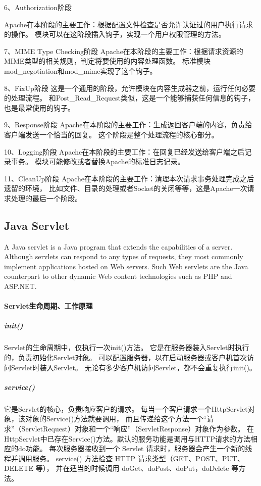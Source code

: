 \documentclass{book}
\begin{document}
6、Authorization阶段 

Apache在本阶段的主要工作：根据配置文件检查是否允许认证过的用户执行请求的操作。
模块可以在这阶段插入钩子，实现一个用户权限管理的方法。

7、MIME Type Checking阶段
Apache在本阶段的主要工作：根据请求资源的MIME类型的相关规则，判定将要使用的内容处理函数。
标准模块mod\_negotiation和mod\_mime实现了这个钩子。

8、FixUp阶段 
这是一个通用的阶段，允许模块在内容生成器之前，运行任何必要的处理流程。
和Post\_Read\_Request类似，这是一个能够捕获任何信息的钩子，也是最常使用的钩子。

9、Response阶段 
Apache在本阶段的主要工作：生成返回客户端的内容，负责给客户端发送一个恰当的回复。
这个阶段是整个处理流程的核心部分。

10、Logging阶段 
Apache在本阶段的主要工作：在回复已经发送给客户端之后记录事务。
模块可能修改或者替换Apache的标准日志记录。

11、CleanUp阶段 
Apache在本阶段的主要工作：清理本次请求事务处理完成之后遗留的环境，
比如文件、目录的处理或者Socket的关闭等等，这是Apache一次请求处理的最后一个阶段。

\subsection{Java Servlet}

A Java servlet is a Java program that extends the capabilities of a server. 
Although servlets can respond to any types of requests, 
they most commonly implement applications hosted on Web servers. 
Such Web servlets are the Java counterpart to other dynamic Web content technologies such as PHP and ASP.NET.

\paragraph{Servlet生命周期、工作原理}

\subparagraph{init()}Servlet的生命周期中，仅执行一次init()方法。
它是在服务器装入Servlet时执行的，负责初始化Servlet对象。
可以配置服务器，以在启动服务器或客户机首次访问Servlet时装入Servlet。
无论有多少客户机访问Servlet，都不会重复执行init()。

\subparagraph{service()}它是Servlet的核心，负责响应客户的请求。
每当一个客户请求一个HttpServlet对象，该对象的Service()方法就要调用，
而且传递给这个方法一个“请求”（ServletRequest）对象和一个“响应”（ServletResponse）对象作为参数。
在HttpServlet中已存在Service()方法。默认的服务功能是调用与HTTP请求的方法相应的do功能。
每次服务器接收到一个 Servlet 请求时，服务器会产生一个新的线程并调用服务。
service() 方法检查 HTTP 请求类型（GET、POST、PUT、DELETE 等），
并在适当的时候调用 doGet、doPost、doPut，doDelete 等方法。
\end{document}
